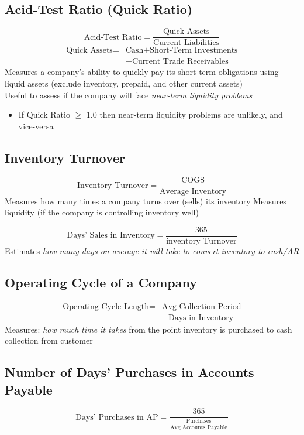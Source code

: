 \documentclass{article}
\begin{document}
\begin{multicols}{2}
\subsection{Acid-Test Ratio (Quick Ratio)}
$$\text{Acid-Test Ratio} = \frac{\text{Quick Assets}}{\text{Current Liabilities}}$$
\begin{equation*}
\begin{aligned}
\text{Quick Assets} = &\text{Cash} + \text{Short-Term Investments}\\
 &+ \text{Current Trade Receivables}
\end{aligned}
\end{equation*}
Measures a company's ability to quickly pay its short-term obligations using liquid assets (exclude inventory, prepaid, and other current assets)\\
Useful to assess if the company will face \textit{near-term liquidity problems}
\begin{itemize}
	\item If Quick Ratio $\geq$ 1.0 then near-term liquidity problems are unlikely, and vice-versa
\end{itemize}

\subsection{Inventory Turnover}
$$\text{Inventory Turnover} = \frac{\text{COGS}}{\text{Average Inventory}}$$
Measures how many times a company turns over (sells) its inventory
Measures liquidity (if the company is controlling inventory well)

$$\text{Days' Sales in Inventory} = \frac{365}{\text{inventory Turnover}}$$
Estimates \textit{how many days on average it will take to convert inventory to cash/AR}

\subsection{Operating Cycle of a Company}
\begin{equation*}
\begin{aligned}
\text{Operating Cycle Length} = & \text{Avg Collection Period} \\&+ \text{Days in Inventory}
\end{aligned}
\end{equation*}
Measures: \textit{how much time it takes} from the point inventory is purchased to cash collection from customer

\subsection{Number of Days' Purchases in Accounts Payable}
$$\text{Days' Purchases in AP} = \frac{365}{\frac{\text{Purchases}}{\text{Avg Accounts Payable}}}$$


\end{multicols}
\end{document}
